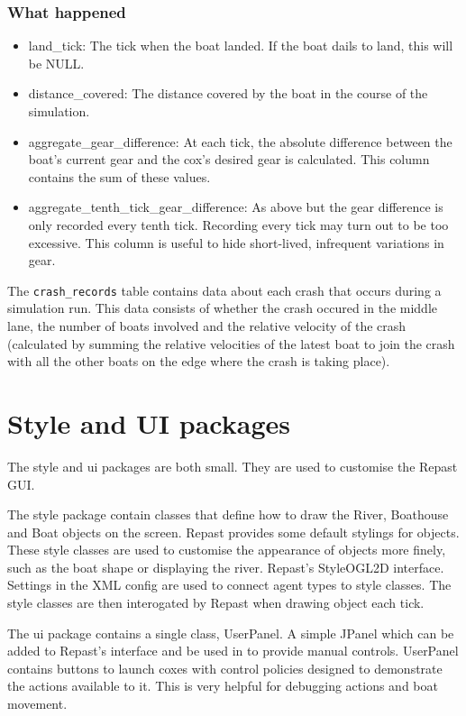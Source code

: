 {\subsubsection{What happened}
\begin{itemize}
  \item{land\_tick:} The tick when the boat landed. If the boat dails
    to land, this will be NULL.
  \item{distance\_covered:} The distance covered by the boat in the
    course of the simulation.
  \item{aggregate\_gear\_difference:} At each tick, the absolute
    difference between the boat's current gear and the cox's desired
    gear is calculated. This column contains the sum of these values.
  \item{aggregate\_tenth\_tick\_gear\_difference:} As above but the
    gear difference is only recorded every tenth tick. Recording every
    tick may turn out to be too excessive. This column is useful to
    hide short-lived, infrequent variations in gear.
\end{itemize}

The \texttt{crash\_records} table contains data about each crash that
occurs during a simulation run. This data consists of whether the
crash occured in the middle lane, the number of boats involved and the
relative velocity of the crash (calculated by summing the relative
velocities of the latest boat to join the crash with all the other
boats on the edge where the crash is taking place).


\section{Style and UI packages}
The style and ui packages are both small. They are used to customise the Repast
GUI. 

The style package contain classes
that define how to draw the River, Boathouse and Boat objects on the
screen. Repast provides some default stylings for objects. These style
classes are used to customise the appearance of objects more finely,
such as the boat shape or displaying the river.
Repast's StyleOGL2D interface. Settings in the XML config are used to
connect agent types to style classes. The style classes are then
interogated by Repast when drawing object each tick.

The ui package contains a single class, UserPanel. A simple JPanel which
can be added to Repast's interface and be used in to provide manual
controls. UserPanel contains buttons to launch coxes with control
policies designed to demonstrate the actions available to it. This is
very helpful for debugging actions and boat movement.

}
